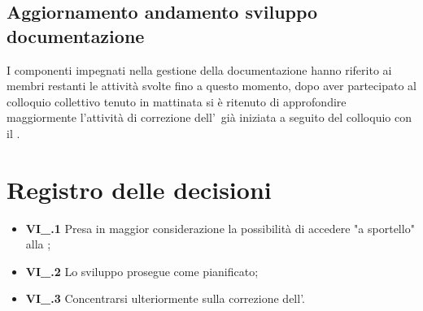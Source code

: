 \subsection{Aggiornamento andamento sviluppo documentazione}
I componenti impegnati nella gestione della documentazione hanno riferito ai membri restanti le attività svolte fino a questo momento, dopo aver partecipato al colloquio collettivo tenuto in mattinata si è ritenuto di approfondire maggiormente l'attività di correzione dell'\AdR\ già iniziata a seguito del colloquio con il \CR{}.

\section{Registro delle decisioni}
\begin{itemize}
	\item \textbf{VI\_\Data.1} Presa in maggior considerazione la possibilità di accedere "a sportello" alla ;
	\item \textbf{VI\_\Data.2} Lo sviluppo prosegue come pianificato;
	\item \textbf{VI\_\Data.3} Concentrarsi ulteriormente sulla correzione dell'\AdR{}.
\end{itemize}